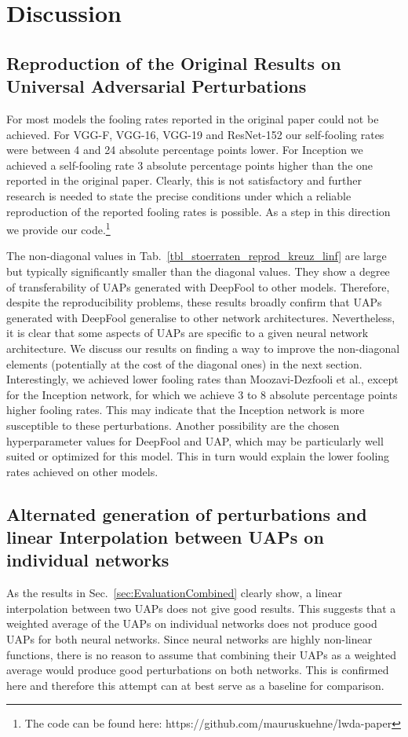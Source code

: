 \documentclass[runningheads]{llncs}
\begin{document}
\section{Discussion}\label{sec:Discussion}
\subsection{Reproduction of the Original Results on Universal Adversarial Perturbations}
For most models the fooling rates reported in the original paper could not be achieved. For VGG-F, VGG-16, VGG-19 and ResNet-152 our  self-fooling rates were between 4 and 24 absolute percentage points lower. For Inception we achieved a self-fooling rate 3 absolute percentage points higher than the one reported in the original paper. Clearly, this is not satisfactory and further research is needed to state the precise conditions under which a reliable reproduction of the reported fooling rates is possible. As a step in this direction we provide our code.\footnote{The code can be found here: https://github.com/mauruskuehne/lwda-paper}

The non-diagonal values in Tab.~\ref{tbl_stoerraten_reprod_kreuz_linf} are large but typically significantly smaller than the diagonal values. They show a degree of transferability of UAPs generated with DeepFool to other models. Therefore, despite the reproducibility problems, these results broadly confirm that UAPs generated with DeepFool generalise to other network architectures. Nevertheless, it is clear that some aspects of UAPs are specific to a given neural network architecture. We discuss our results on finding a way to improve the non-diagonal elements (potentially at the cost of the diagonal ones) in the next section.
Interestingly, we achieved lower fooling rates than Moozavi-Dezfooli et al., except for the Inception network, for which we achieve 3 to 8 absolute percentage points higher fooling rates. This may indicate that the Inception network is more susceptible to these perturbations. Another possibility are the chosen hyperparameter values for DeepFool and UAP, which may be particularly well suited or optimized for this model. This in turn would explain the lower fooling rates achieved on other models.

\subsection{Alternated generation of perturbations and linear Interpolation be\-tween UAPs on individual networks}
As the results in Sec.~\ref{sec:EvaluationCombined} clearly show, a linear interpolation between two UAPs does not give good results. This suggests that a weighted average of the UAPs on individual networks does not produce good UAPs for both neural networks. Since neural networks are highly non-linear functions, there is no reason to assume that combining their UAPs as a weighted average would produce good perturbations on both networks. This is confirmed here and therefore this attempt can at best serve as a baseline for comparison. 
\end{document}
